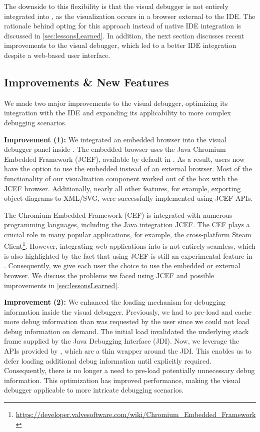 \documentclass[sigconf]{acmart}
\begin{document}
The downside to this flexibility is that the visual debugger is not entirely integrated into \intellij{}, as the visualization occurs in a browser external to the IDE.
The rationale behind opting for this approach instead of native IDE integration is discussed in \autoref{sec:lessonsLearned}.
In addition, the next section discusses recent improvements to the visual debugger, which led to a better IDE integration despite a web-based user interface.

\subsection{Improvements \& New Features} \label{subsec:improvements}
We made two major improvements to the visual debugger, optimizing its integration with the IDE and expanding its applicability to more complex debugging scenarios.

\textbf{Improvement (1):} We integrated an embedded browser into the visual debugger panel inside \intellij{}.
The embedded browser uses the Java Chromium Embedded Framework (JCEF), available by default in \intellij{}.
As a result, users now have the option to use the embedded instead of an external browser.
Most of the functionality of our visualization component worked out of the box with the JCEF browser.
Additionally, nearly all other features, for example, exporting object diagrams to XML/SVG, were successfully implemented using JCEF APIs.

The Chromium Embedded Framework (CEF) \cite{marshallgreenblattChromiumEmbeddedFramework2023} is integrated with numerous programming languages, including the Java integration JCEF.
The CEF plays a crucial role in many popular applications, for example, the cross-platform Steam Client\footnote{\url{https://developer.valvesoftware.com/wiki/Chromium_Embedded_Framework}}.
However, integrating web applications into \intellij{} is not entirely seamless, which is also highlighted by the fact that using JCEF is still an experimental feature in \intellij{}.
Consequently, we give each user the choice to use the embedded or external browser.
We discuss the problems we faced using JCEF and possible improvements in \autoref{sec:lessonsLearned}.

\textbf{Improvement (2):} We enhanced the loading mechanism for debugging information inside the visual debugger.
Previously, we had to pre-load and cache more debug information than was requested by the user since we could not load debug information on demand.
The initial load invalidated the underlying stack frame supplied by the Java Debugging Interface (JDI).
Now, we leverage the APIs provided by \intellij{}, which are a thin wrapper around the JDI.
This enables us to defer loading additional debug information until explicitly required.
Consequently, there is no longer a need to pre-load potentially unnecessary debug information.
This optimization has improved performance, making the visual debugger applicable to more intricate debugging scenarios.
\end{document}
